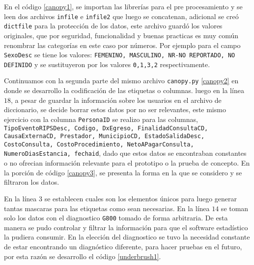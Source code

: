    
  
  En el código \ref{canopy1}, se importan las librerías para el pre procesamiento y se leen dos archivos \texttt{infile} e  \texttt{infile2} que luego se concatenan, adicional se creó \texttt{dictfile} para la protección de los datos, este archivo guardó los valores originales, que por seguridad, funcionalidad y buenas practicas es muy común renombrar las categorías en este caso por números. Por ejemplo para el campo \texttt{SexoDesc} se tiene los valores: \texttt{FEMENINO, MASCULINO, NR-NO REPORTADO, NO DEFINIDO} y se sustituyeron por los valores \texttt{0,1,3,2} respectivamente.
 
     
  
  Continuamos con la segunda parte del mismo archivo \texttt{canopy.py} \ref{canopy2} en donde se desarrollo la codificación de las etiquetas o columnas. luego en la línea $18$, a pesar de guardar la información sobre los usuarios en el archivo de diccionario, se decide borrar estos datos por no ser relevantes, este mismo ejercicio con la columna \texttt{PersonaID} se realizo para las columnas, \texttt{TipoEventoRIPSDesc, Codigo, DxEgreso, FinalidadConsultaCD, CausaExternaCD, Prestador, MunicipioCD, EstadoSalidaDesc, CostoConsulta, CostoProcedimiento, NetoAPagarConsulta, NumeroDiasEstancia, fechaid}, dado que estos datos se encontraban constantes o no ofrecian información relevante para el prototipo o la prueba de concepto.  En la porción de código \ref{canopy3}, se presenta la forma en la que se considero y se filtraron los datos.
  
     
  
  En la línea $3$ se establecen cuales son los elementos únicos para luego generar tantas mascaras para las etiquetas como sean necesarias. En la línea $14$ se toman solo los datos con el diagnostico \texttt{G800} tomado de forma arbitraria.
  De esta manera se pudo controlar y filtrar la información para que el software estadístico la pudiera consumir.
  En la elección del diagnostico se tuvo la necesidad constante de estar encontrando un diagnóstico diferente, para hacer pruebas en el futuro, por esta razón se desarrollo el código \ref{underbrush1}.
  
